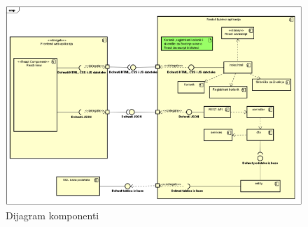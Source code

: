 \begin{figure}[!htb]
	\centering
	\includegraphics[width=\textwidth]{slike/Dijagram_komponenti}
	\caption{Dijagram komponenti}
\end{figure}